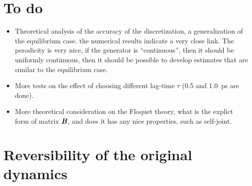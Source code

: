 \documentclass[aps, pre, preprint,unsortedaddress,a4paper,onecolumn]{revtex4}
\newcommand{\vect}[1]{\textbf{\textit{#1}}}
\begin{document}
\section{To do}

\begin{itemize}
\item Theoretical analysis of the accuracy of the discretization, a
generalization of the equilibrium case. the numerical results indicate
a very close link. The perodicity is very nice, if the generator is
``continuous'', then it should be uniformly continuous, then it should
be possible to develop estimates that are similar to the equilibrium
case.
\item More tests on the effect of choosing different lag-time $\tau$ (0.5 and 1.0~ps are done).
\item More theoretical consideration on the Floquet theory, what is the
explict form of matrix $\vect B$, and does it has any nice properties,
such as self-joint.
\end{itemize}



\section{Reversibility of the original dynamics}
\end{document}

